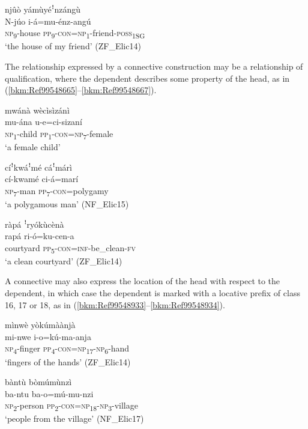 \ea
\label{bkm:Ref99548647}
njûò yámùyéꜝnzángù\\
\gll N-júo    i-á=mu-énz-angú\\
\textsc{np}\textsubscript{9}-house  \textsc{pp}\textsubscript{9}-\textsc{con}=\textsc{np}\textsubscript{1}-friend-\textsc{poss}\textsubscript{1SG}\\
\glt ‘the house of my friend’ (ZF\_Elic14)
\z

The relationship expressed by a connective construction may be a relationship of qualification, where the dependent describes some property of the head, as in (\ref{bkm:Ref99548665}--\ref{bkm:Ref99548667}).

\ea
\label{bkm:Ref99548665}
mwánà wècìsìzánì\\
\gll mu-ána  u-e=ci-sizaní\\
\textsc{np}\textsubscript{1}-child  \textsc{pp}\textsubscript{1}-\textsc{con}=\textsc{np}\textsubscript{7}-female\\
\glt ‘a female child’
\z

\ea
cíꜝkwáꜝmé cáꜝmárì\\
\gll cí-kwamé  ci-á=marí\\
\textsc{np}\textsubscript{7}-man  \textsc{pp}\textsubscript{7}-\textsc{con}=polygamy\\
\glt ‘a polygamous man’ (NF\_Elic15)
\z

\ea
\label{bkm:Ref99548667}
ràpá ꜝryókùcènà\\
\gll rapá    ri-ó=ku-cen-a\\
courtyard  \textsc{pp}\textsubscript{5}-\textsc{con}=\textsc{inf}-be\_clean-\textsc{fv}\\
\glt ‘a clean courtyard’ (ZF\_Elic14)
\z

A connective may also express the location of the head with respect to the dependent, in which case the dependent is marked with a locative prefix of class 16, 17 or 18, as in (\ref{bkm:Ref99548933}--\ref{bkm:Ref99548934}).

\ea
\label{bkm:Ref99548933}
mìnwè yòkúmàànjà\\
\gll mi-nwe  i-o=kú-ma-anja\\
\textsc{np}\textsubscript{4}-finger  \textsc{pp}\textsubscript{4}-\textsc{con}=\textsc{np}\textsubscript{17}-\textsc{np}\textsubscript{6}-hand\\
\glt ‘fingers of the hands’ (ZF\_Elic14)
\z

\ea
\label{bkm:Ref99548934}
bàntù bòmúmùnzì\\
\gll ba-ntu  ba-o=mú-mu-nzi\\
\textsc{np}\textsubscript{2}-person  \textsc{pp}\textsubscript{2}-\textsc{con}=\textsc{np}\textsubscript{18}-\textsc{np}\textsubscript{3}-village\\
\glt ‘people from the village’ (NF\_Elic17)
\z


